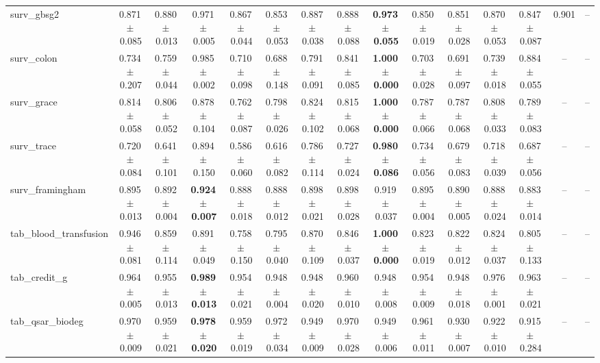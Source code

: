 \documentclass[8pt]{extarticle}
\begin{document}
\begin{longtable}{l*{14}{c}}
surv\_gbsg2 & 0.871\,$\pm$\,0.085 & 0.880\,$\pm$\,0.013 & 0.971\,$\pm$\,0.005 & 0.867\,$\pm$\,0.044 & 0.853\,$\pm$\,0.053 & 0.887\,$\pm$\,0.038 & 0.888\,$\pm$\,0.088 & \textbf{0.973\,$\pm$\,0.055} & 0.850\,$\pm$\,0.019 & 0.851\,$\pm$\,0.028 & 0.870\,$\pm$\,0.053 & 0.847\,$\pm$\,0.087 & 0.901 & -- \\
surv\_colon & 0.734\,$\pm$\,0.207 & 0.759\,$\pm$\,0.044 & 0.985\,$\pm$\,0.002 & 0.710\,$\pm$\,0.098 & 0.688\,$\pm$\,0.148 & 0.791\,$\pm$\,0.091 & 0.841\,$\pm$\,0.085 & \textbf{1.000\,$\pm$\,0.000} & 0.703\,$\pm$\,0.028 & 0.691\,$\pm$\,0.097 & 0.739\,$\pm$\,0.018 & 0.884\,$\pm$\,0.055 & -- & -- \\
surv\_grace & 0.814\,$\pm$\,0.058 & 0.806\,$\pm$\,0.052 & 0.878\,$\pm$\,0.104 & 0.762\,$\pm$\,0.087 & 0.798\,$\pm$\,0.026 & 0.824\,$\pm$\,0.102 & 0.815\,$\pm$\,0.068 & \textbf{1.000\,$\pm$\,0.000} & 0.787\,$\pm$\,0.066 & 0.787\,$\pm$\,0.068 & 0.808\,$\pm$\,0.033 & 0.789\,$\pm$\,0.083 & -- & -- \\
surv\_trace & 0.720\,$\pm$\,0.084 & 0.641\,$\pm$\,0.101 & 0.894\,$\pm$\,0.150 & 0.586\,$\pm$\,0.060 & 0.616\,$\pm$\,0.082 & 0.786\,$\pm$\,0.114 & 0.727\,$\pm$\,0.024 & \textbf{0.980\,$\pm$\,0.086} & 0.734\,$\pm$\,0.056 & 0.679\,$\pm$\,0.083 & 0.718\,$\pm$\,0.039 & 0.687\,$\pm$\,0.056 & -- & -- \\
surv\_framingham & 0.895\,$\pm$\,0.013 & 0.892\,$\pm$\,0.004 & \textbf{0.924\,$\pm$\,0.007} & 0.888\,$\pm$\,0.018 & 0.888\,$\pm$\,0.012 & 0.898\,$\pm$\,0.021 & 0.898\,$\pm$\,0.028 & 0.919\,$\pm$\,0.037 & 0.895\,$\pm$\,0.004 & 0.890\,$\pm$\,0.005 & 0.888\,$\pm$\,0.024 & 0.883\,$\pm$\,0.014 & -- & -- \\
tab\_blood\_transfusion & 0.946\,$\pm$\,0.081 & 0.859\,$\pm$\,0.114 & 0.891\,$\pm$\,0.049 & 0.758\,$\pm$\,0.150 & 0.795\,$\pm$\,0.040 & 0.870\,$\pm$\,0.109 & 0.846\,$\pm$\,0.037 & \textbf{1.000\,$\pm$\,0.000} & 0.823\,$\pm$\,0.019 & 0.822\,$\pm$\,0.012 & 0.824\,$\pm$\,0.037 & 0.805\,$\pm$\,0.133 & -- & -- \\
tab\_credit\_g & 0.964\,$\pm$\,0.005 & 0.955\,$\pm$\,0.013 & \textbf{0.989\,$\pm$\,0.013} & 0.954\,$\pm$\,0.021 & 0.948\,$\pm$\,0.004 & 0.948\,$\pm$\,0.020 & 0.960\,$\pm$\,0.010 & 0.948\,$\pm$\,0.008 & 0.954\,$\pm$\,0.009 & 0.948\,$\pm$\,0.018 & 0.976\,$\pm$\,0.001 & 0.963\,$\pm$\,0.021 & -- & -- \\
tab\_qsar\_biodeg & 0.970\,$\pm$\,0.009 & 0.959\,$\pm$\,0.021 & \textbf{0.978\,$\pm$\,0.020} & 0.959\,$\pm$\,0.019 & 0.972\,$\pm$\,0.034 & 0.949\,$\pm$\,0.009 & 0.970\,$\pm$\,0.028 & 0.949\,$\pm$\,0.006 & 0.961\,$\pm$\,0.011 & 0.930\,$\pm$\,0.007 & 0.922\,$\pm$\,0.010 & 0.915\,$\pm$\,0.284 & -- & -- \\

\end{longtable}
\end{document}
